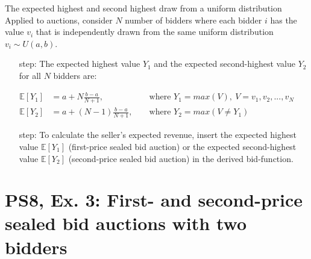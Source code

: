 \begin{frame}{The expected highest and second highest draw from a uniform distribution}
    Applied to auctions, consider $N$ number of bidders where each bidder $i$ has the value $v_i$ that is independently drawn from the same uniform distribution $v_i\sim U(a,b)$.
    \begin{itemize}
      \item[\nth{1} step:] The expected highest value $Y_1$ and the expected second-highest value $Y_2$ for all $N$ bidders are:
    \end{itemize}
    \begin{align*}
      \mathbb{E}[Y_1]&=a+N\frac{b-a}{N+1},&&\text{ where }Y_1=max(V),\ V=v_1,v_2,...,v_N\\
      \mathbb{E}[Y_2]&=a+(N-1)\frac{b-a}{N+1},&&\text{ where }Y_2=max(V\neq Y_1)
    \end{align*}
    \begin{itemize}
      \item[\nth{2} step:] To calculate the seller's expected revenue, insert the expected highest value $\mathbb{E}[Y_1]$ (first-price sealed bid auction) or the expected second-highest value $\mathbb{E}[Y_2]$ (second-price sealed bid auction) in the derived bid-function.
    \end{itemize}
    \vfill\null
\end{frame}



\section{PS8, Ex. 3: First- and second-price sealed bid auctions with two bidders}

